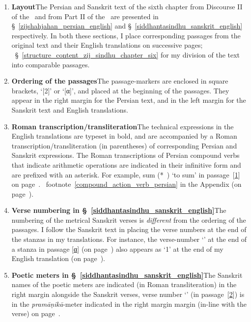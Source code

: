 \begin{enumerate}[topsep=0pt]
     \item \textbf{Layout}\quad The Persian and Sanskrit text of the sixth chapter from Discourse II of the \ZijiShahJahani\ and from Part II of the \Siddhantasindhu\ are presented in \S~\ref{zijshahjahan_persian_english} and \S~\ref{siddhantasindhu_sanskrit_english} respectively. In both these sections, I place corresponding passages from the original text and their English translations on successive pages; \vid\ \S~\ref{structure_content_zij_sindhu_chapter_six} for my division of the text into comparable passages.
    \item \textbf{Ordering of the passages}\quad The passage-markers are enclosed in square brackets, \eg `[2]' or `[α]', and placed at the beginning of the passages. They appear in the right margin for the Persian text, and in the left margin for the Sanskrit text and English translations. 
    \item \textbf{Roman transcription/transliteration}\quad The technical expressions in the English translations are typeset in bold, and are accompanied by a Roman transcription/transliteration (in parentheses) of corresponding Persian and Sanskrit expressions. The Roman transcriptions of Persian compound verbs that indicate arithmetic operations are indicated in their infinitive form and are prefixed with an asterisk. For example, \gls{sum} (*\jam\ \kardan) `to sum' in passage~[\hyperlink{PEpass1}{1}] on page~\pageref{passage_1_english_persian}. \Vid\ footnote~\ref{compound_action_verb_persian} in the Appendix (on page~\pageref{Appendix_verbs}).
    \item \textbf{Verse numbering in \S~\ref{siddhantasindhu_sanskrit_english}}\quad The numbering of the metrical Sanskrit verses is \textit{different} from the ordering of the passages. I follow the Sanskrit text in placing the verse numbers at the end of the stanzas in my translations. For instance, the verse-number `' at the end of a stanza in passage [\hyperlink{SpassA}{α}] (on page~\pageref{verse_1_label_sans_example}) also appears as `1' at the end of my English translation (on page~\pageref{verse_1_label_eng_example}).  
    \item \textbf{Poetic meters in \S~\ref{siddhantasindhu_sanskrit_english}}\quad The Sanskrit names of the poetic meters are indicated (in Roman transliteration) in the right margin alongside the Sanskrit verses, \eg verse number `' (in passage~[\hyperlink{Spass2}{2}]) is in the \textit{pramāṇikā}-meter indicated in the right margin margin (in-line with the verse) on page~\pageref{sanskrit_meter_typography_example}.

\end{enumerate}
